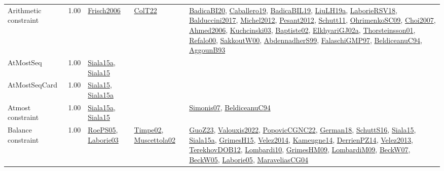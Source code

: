 {\begin{longtable}{p{3cm}r>{\raggedright\arraybackslash}p{6cm}>{\raggedright\arraybackslash}p{6cm}>{\raggedright\arraybackslash}p{8cm}}
\index{Arithmetic constraint}\index{Constraints!Arithmetic constraint}Arithmetic constraint &  1.00 & \hyperref[detail:Frisch2006]{Frisch2006} & \hyperref[detail:ColT22]{ColT22} & \hyperref[detail:BadicaBI20]{BadicaBI20}, \hyperref[detail:Caballero19]{Caballero19}, \hyperref[detail:BadicaBIL19]{BadicaBIL19}, \hyperref[detail:LiuLH19a]{LiuLH19a}, \hyperref[detail:LaborieRSV18]{LaborieRSV18}, \hyperref[detail:Balduccini2017]{Balduccini2017}, \hyperref[detail:Michel2012]{Michel2012}, \hyperref[detail:Pesant2012]{Pesant2012}, \hyperref[detail:Schutt11]{Schutt11}, \hyperref[detail:OhrimenkoSC09]{OhrimenkoSC09}, \hyperref[detail:Choi2007]{Choi2007}, \hyperref[detail:Ahmed2006]{Ahmed2006}, \hyperref[detail:Kuchcinski03]{Kuchcinski03}, \hyperref[detail:Baptiste02]{Baptiste02}, \hyperref[detail:ElkhyariGJ02a]{ElkhyariGJ02a}, \hyperref[detail:Thorsteinsson01]{Thorsteinsson01}, \hyperref[detail:Refalo00]{Refalo00}, \hyperref[detail:SakkoutW00]{SakkoutW00}, \hyperref[detail:AbdennadherS99]{AbdennadherS99}, \hyperref[detail:FalaschiGMP97]{FalaschiGMP97}, \hyperref[detail:BeldiceanuC94]{BeldiceanuC94}, \hyperref[detail:AggounB93]{AggounB93}\\
\index{AtMostSeq}\index{Constraints!AtMostSeq}AtMostSeq &  1.00 & \hyperref[detail:Siala15a]{Siala15a}, \hyperref[detail:Siala15]{Siala15} &  & \\
\index{AtMostSeqCard}\index{Constraints!AtMostSeqCard}AtMostSeqCard &  1.00 & \hyperref[detail:Siala15]{Siala15}, \hyperref[detail:Siala15a]{Siala15a} &  & \\
\index{Atmost constraint}\index{Constraints!Atmost constraint}Atmost constraint &  1.00 & \hyperref[detail:Siala15a]{Siala15a}, \hyperref[detail:Siala15]{Siala15} &  & \hyperref[detail:Simonis07]{Simonis07}, \hyperref[detail:BeldiceanuC94]{BeldiceanuC94}\\
\index{Balance constraint}\index{Constraints!Balance constraint}Balance constraint &  1.00 & \hyperref[detail:RoePS05]{RoePS05}, \hyperref[detail:Laborie03]{Laborie03} & \hyperref[detail:Timpe02]{Timpe02}, \hyperref[detail:Muscettola02]{Muscettola02} & \hyperref[detail:GuoZ23]{GuoZ23}, \hyperref[detail:Valouxis2022]{Valouxis2022}, \hyperref[detail:PopovicCGNC22]{PopovicCGNC22}, \hyperref[detail:German18]{German18}, \hyperref[detail:SchuttS16]{SchuttS16}, \hyperref[detail:Siala15]{Siala15}, \hyperref[detail:Siala15a]{Siala15a}, \hyperref[detail:GrimesH15]{GrimesH15}, \hyperref[detail:Velez2014]{Velez2014}, \hyperref[detail:Kameugne14]{Kameugne14}, \hyperref[detail:DerrienPZ14]{DerrienPZ14}, \hyperref[detail:Velez2013]{Velez2013}, \hyperref[detail:TerekhovDOB12]{TerekhovDOB12}, \hyperref[detail:Lombardi10]{Lombardi10}, \hyperref[detail:GrimesHM09]{GrimesHM09}, \hyperref[detail:LombardiM09]{LombardiM09}, \hyperref[detail:BeckW07]{BeckW07}, \hyperref[detail:BeckW05]{BeckW05}, \hyperref[detail:Laborie05]{Laborie05}, \hyperref[detail:MaraveliasCG04]{MaraveliasCG04}\\

\end{longtable}}
